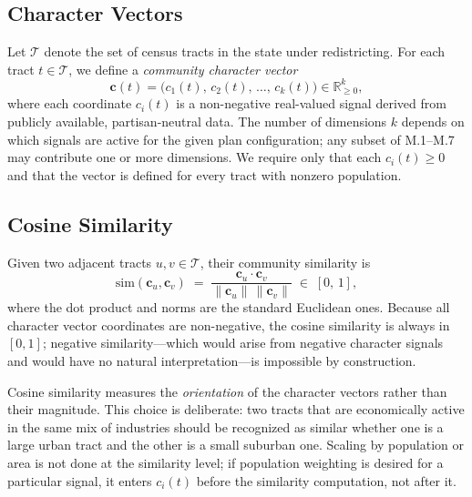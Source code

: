 \label{sec:framework}

\subsection{Character Vectors}

Let $\mathcal{T}$ denote the set of census tracts in the state under redistricting.
For each tract $t \in \mathcal{T}$, we define a \emph{community character vector}
\begin{equation}
  \mathbf{c}(t) = \bigl(c_1(t),\, c_2(t),\, \ldots,\, c_k(t)\bigr) \in \mathbb{R}^k_{\geq 0},
  \label{eq:char-vector}
\end{equation}
where each coordinate $c_i(t)$ is a non-negative real-valued signal derived from
publicly available, partisan-neutral data.
The number of dimensions $k$ depends on which signals are active for the given plan
configuration; any subset of M.1--M.7 may contribute one or more dimensions.
We require only that each $c_i(t) \geq 0$ and that the vector is defined for every
tract with nonzero population.

\subsection{Cosine Similarity}

Given two adjacent tracts $u, v \in \mathcal{T}$, their community similarity is
\begin{equation}
  \mathrm{sim}(\mathbf{c}_u, \mathbf{c}_v)
  \;=\;
  \frac{\mathbf{c}_u \cdot \mathbf{c}_v}{\|\mathbf{c}_u\| \, \|\mathbf{c}_v\|}
  \;\in\; [0,\, 1],
  \label{eq:cosine-sim}
\end{equation}
where the dot product and norms are the standard Euclidean ones.
Because all character vector coordinates are non-negative, the cosine similarity is
always in $[0,1]$; negative similarity---which would arise from negative character
signals and would have no natural interpretation---is impossible by construction.

Cosine similarity measures the \emph{orientation} of the character vectors rather
than their magnitude.
This choice is deliberate: two tracts that are economically active in the same mix of
industries should be recognized as similar whether one is a large urban tract and
the other is a small suburban one.
Scaling by population or area is not done at the similarity level; if population
weighting is desired for a particular signal, it enters $c_i(t)$ before the similarity
computation, not after it.

